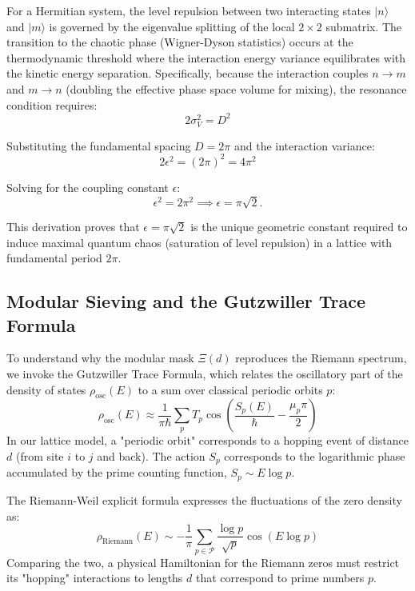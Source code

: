 \documentclass[prl,aps,floatfix,superscriptaddress,10pt]{revtex4-2}
\begin{document}
For a Hermitian system, the level repulsion between two interacting states $|n\rangle$ and $|m\rangle$ is governed by the eigenvalue splitting of the local $2 \times 2$ submatrix. The transition to the chaotic phase (Wigner-Dyson statistics) occurs at the thermodynamic threshold where the interaction energy variance equilibrates with the kinetic energy separation. Specifically, because the interaction couples $n \to m$ and $m \to n$ (doubling the effective phase space volume for mixing), the resonance condition requires:
\begin{equation}
2 \sigma_V^2 = D^2
\end{equation}

Substituting the fundamental spacing $D = 2\pi$ and the interaction variance:
\begin{equation}
2 \epsilon^2 = (2\pi)^2 = 4\pi^2
\end{equation}

Solving for the coupling constant $\epsilon$:
\begin{equation}
\epsilon^2 = 2\pi^2 \implies \epsilon = \pi\sqrt{2}.
\end{equation}

This derivation proves that $\epsilon = \pi\sqrt{2}$ is the unique geometric constant required to induce maximal quantum chaos (saturation of level repulsion) in a lattice with fundamental period $2\pi$.

\subsection{Modular Sieving and the Gutzwiller Trace Formula}

To understand why the modular mask $\Xi(d)$ reproduces the Riemann spectrum, we invoke the Gutzwiller Trace Formula, which relates the oscillatory part of the density of states $\rho_{\text{osc}}(E)$ to a sum over classical periodic orbits $p$:
\begin{equation}
\rho_{\text{osc}}(E) \approx \frac{1}{\pi \hbar} \sum_p T_p \cos\left( \frac{S_p(E)}{\hbar} - \frac{\mu_p \pi}{2} \right)
\end{equation}
In our lattice model, a "periodic orbit" corresponds to a hopping event of distance $d$ (from site $i$ to $j$ and back). The action $S_p$ corresponds to the logarithmic phase accumulated by the prime counting function, $S_p \sim E \log p$.

The Riemann-Weil explicit formula expresses the fluctuations of the zero density as:
\begin{equation}
\rho_{\text{Riemann}}(E) \sim -\frac{1}{\pi} \sum_{p \in \mathcal{P}} \frac{\log p}{\sqrt{p}} \cos(E \log p)
\end{equation}
Comparing the two, a physical Hamiltonian for the Riemann zeros must restrict its "hopping" interactions to lengths $d$ that correspond to prime numbers $p$.
\end{document}
